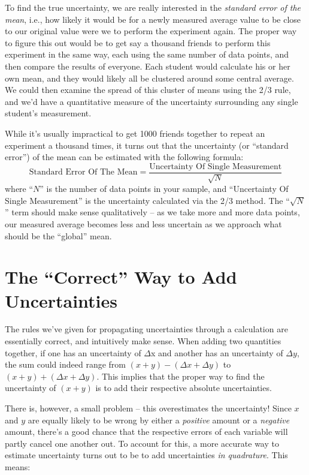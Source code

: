 \documentclass[letterpaper, 12pt]{book}
\newcommand{\myskip}{\vspace{0.5\baselineskip}}
\begin{document}
To find the true uncertainty, we are really interested in the \emph{standard error of the mean}, i.e., how likely it would be for a newly measured average value to be close to our original value were we to perform the experiment again.  The proper way to figure this out would be to get say a thousand friends to perform this experiment in the same way, each using the same number of data points, and then compare the results of everyone.  Each student would calculate his or her own mean, and they would likely all be clustered around some central average.  We could then examine the spread of this cluster of means using the 2/3 rule, and we'd have a quantitative measure of the uncertainty surrounding any single student's measurement.\myskip

While it's usually impractical to get 1000 friends together to repeat an experiment a thousand times, it turns out that the uncertainty (or ``standard error'') of the mean can be estimated with the following formula:
\begin{equation}
    \text{Standard Error Of The Mean} = \frac{\text{Uncertainty Of Single Measurement}}{\sqrt{N}}
\end{equation}
where ``$N$'' is the number of data points in your sample, and ``Uncertainty Of Single Measurement'' is the uncertainty calculated via the 2/3 method.  The ``$\sqrt{N}$'' term should make sense qualitatively -- as we take more and more data points, our measured average becomes less and less uncertain as we approach what should be the ``global'' mean.

\section{The ``Correct'' Way to Add Uncertainties}

The rules we've given for propagating uncertainties through a calculation are essentially correct, and intuitively make sense.  When adding two quantities together, if one has an uncertainty of $\Delta$x and another has an uncertainty of $\Delta y$, the sum could indeed range from $(x+y) - (\Delta x +  \Delta y)$ to $(x+y) + (\Delta x + \Delta y)$.  This implies that the proper way to find the uncertainty of $(x+y)$ is to add their respective absolute uncertainties. \myskip

There is, however, a small problem -- this overestimates the uncertainty!  Since $x$ and $y$ are equally likely to be wrong by either a \emph{positive} amount or a \emph{negative} amount, there's a good chance that the respective errors of each variable will partly cancel one another out.  To account for this, a more accurate way to estimate uncertainty turns out to be to add uncertainties \emph{in quadrature}.  This means:\myskip
\end{document}

